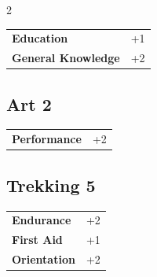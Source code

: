 \begin{multicols}{2}
\begin{tcolorbox}
\begin{tabular}{@{}ll@{}}
    \textbf{Education} & +1\\
    \textbf{General Knowledge} & +2\\
\end{tabular}


\end{tcolorbox}

\begin{tcolorbox}
    \subsection*{Art \hfill \small{2 }}
    \tcblower




\begin{tabular}{@{}ll@{}}
    \textbf{Performance} & +2\\
\end{tabular}


\end{tcolorbox}

\begin{tcolorbox}
    \subsection*{Trekking \hfill \small{5 }}
    \tcblower




\begin{tabular}{@{}ll@{}}
    \textbf{Endurance} & +2\\
    \textbf{First Aid} & +1\\
    \textbf{Orientation} & +2\\
\end{tabular}



\end{tcolorbox}
\end{multicols}
